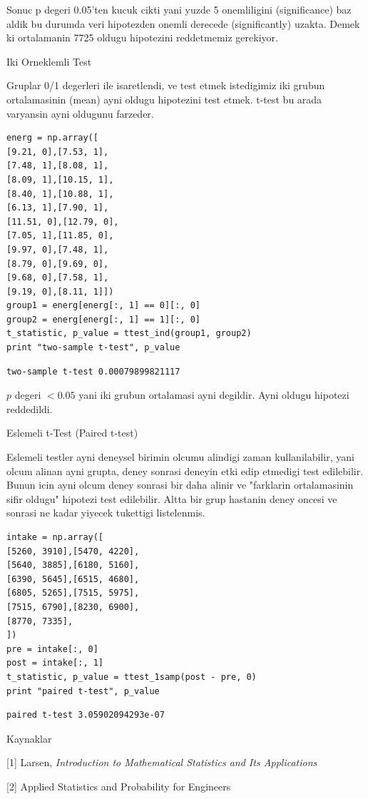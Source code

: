 \documentclass[12pt,fleqn]{article}\usepackage{../common}
\begin{document}
Sonuc p degeri 0.05'ten kucuk cikti yani yuzde 5 onemliligini
(significance) baz aldik bu durumda veri hipotezden onemli derecede
(significantly) uzakta. Demek ki ortalamanin 7725 oldugu hipotezini
reddetmemiz gerekiyor.

Iki Orneklemli Test

Gruplar 0/1 degerleri ile isaretlendi, ve test etmek istedigimiz iki grubun
ortalamasinin (mean) ayni oldugu hipotezini test etmek. t-test bu arada
varyansin ayni oldugunu farzeder.

\begin{verbatim}
energ = np.array([
[9.21, 0],[7.53, 1],
[7.48, 1],[8.08, 1],
[8.09, 1],[10.15, 1],
[8.40, 1],[10.88, 1],
[6.13, 1],[7.90, 1],
[11.51, 0],[12.79, 0],
[7.05, 1],[11.85, 0],
[9.97, 0],[7.48, 1],
[8.79, 0],[9.69, 0],
[9.68, 0],[7.58, 1],
[9.19, 0],[8.11, 1]])
group1 = energ[energ[:, 1] == 0][:, 0]
group2 = energ[energ[:, 1] == 1][:, 0]
t_statistic, p_value = ttest_ind(group1, group2)
print "two-sample t-test", p_value
\end{verbatim}

\begin{verbatim}
two-sample t-test 0.00079899821117
\end{verbatim}

$p$ degeri $< 0.05$ yani iki grubun ortalamasi ayni degildir. Ayni oldugu
hipotezi reddedildi.

Eslemeli t-Test (Paired t-test)

Eslemeli testler ayni deneysel birimin olcumu alindigi zaman
kullanilabilir, yani olcum alinan ayni grupta, deney sonrasi deneyin
etki edip etmedigi test edilebilir. Bunun icin ayni olcum deney
sonrasi bir daha alinir ve "farklarin ortalamasinin sifir oldugu"
hipotezi test edilebilir. Altta bir grup hastanin deney oncesi ve
sonrasi ne kadar yiyecek tukettigi listelenmis. 

\begin{verbatim}
intake = np.array([
[5260, 3910],[5470, 4220],
[5640, 3885],[6180, 5160],
[6390, 5645],[6515, 4680],
[6805, 5265],[7515, 5975],
[7515, 6790],[8230, 6900],
[8770, 7335],
])
pre = intake[:, 0]
post = intake[:, 1]
t_statistic, p_value = ttest_1samp(post - pre, 0)
print "paired t-test", p_value
\end{verbatim}

\begin{verbatim}
paired t-test 3.05902094293e-07
\end{verbatim}

Kaynaklar

[1] Larsen, {\em Introduction to Mathematical Statistics and Its Applications}

[2] Applied Statistics and Probability for Engineers
\end{document}
